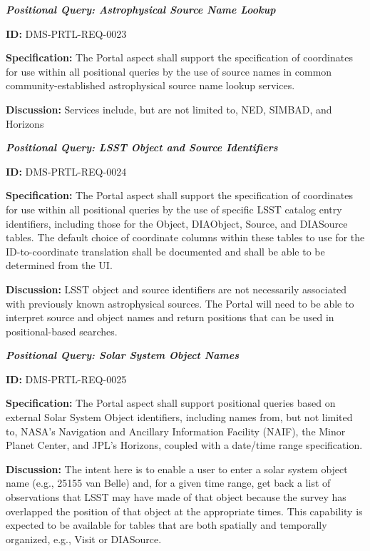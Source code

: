 \documentclass[SE,toc]{lsstdoc}
\begin{document}
\textbf{\textit{Positional Query: Astrophysical Source Name Lookup}}

\label{DMS-PRTL-REQ-0023}
\textbf{ID:} DMS-PRTL-REQ-0023

\textbf{Specification:}
The Portal aspect shall support the specification of coordinates for use within all positional queries by the use of source names in common community-established astrophysical source name lookup services.

\textbf{Discussion:}
Services include, but are not limited to, NED, SIMBAD, and Horizons

\textbf{\textit{Positional Query: LSST Object and Source Identifiers}}

\label{DMS-PRTL-REQ-0024}
\textbf{ID:} DMS-PRTL-REQ-0024

\textbf{Specification:}
The Portal aspect shall support the specification of coordinates for use within all positional queries by the use of specific LSST catalog entry identifiers, including those for the Object, DIAObject, Source, and DIASource tables.  The default choice of coordinate columns within these tables to use for the ID-to-coordinate translation shall be documented and shall be able to be determined from the UI.

\textbf{Discussion:}
LSST object and source identifiers are not necessarily associated with previously known astrophysical sources.  The Portal will need to be able to interpret source and object names and return positions that can be used in positional-based searches.

\textbf{\textit{Positional Query: Solar System Object Names}}

\label{DMS-PRTL-REQ-0025}
\textbf{ID:} DMS-PRTL-REQ-0025

\textbf{Specification:}
The Portal aspect shall support positional queries based on external Solar System Object identifiers, including names from, but not limited to, NASA’s Navigation and Ancillary Information Facility (NAIF), the Minor Planet Center, and JPL’s Horizons, coupled with a date/time range specification.

\textbf{Discussion:}
The intent here is to enable a user to enter a solar system object name (e.g., 25155 van Belle) and, for a given time range, get back a list of observations that LSST may have made of that object because the survey has overlapped the position of that object at the appropriate times.
This capability is expected to be available for tables that are both spatially and temporally organized, e.g., Visit or DIASource.
\end{document}

